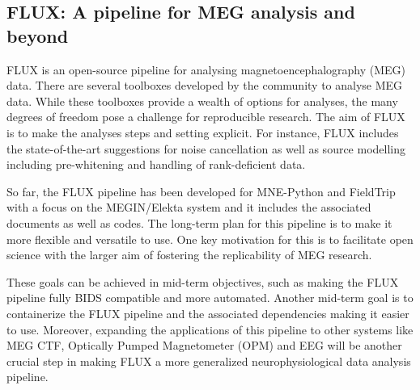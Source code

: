 \documentclass[../main.tex]{subfiles}
\begin{document}
\subsection{FLUX: A pipeline for MEG analysis and beyond}\label{sec:FLUX}


FLUX\supercite{Ferrante2022} is an open-source pipeline for analysing magnetoencephalography (MEG) data. There are several toolboxes developed by the community to analyse MEG data. While these toolboxes provide a wealth of options for analyses, the many degrees of freedom pose a challenge for reproducible research. The aim of FLUX is to make the analyses steps and setting explicit. For instance, FLUX includes the state-of-the-art suggestions for noise cancellation as well as source modelling including pre-whitening and handling of rank-deficient data.

So far, the FLUX pipeline has been developed for MNE-Python\supercite{Gramfort2014} and FieldTrip\supercite{Oostenveld2011} with a focus on the MEGIN/Elekta system and it includes the associated documents as well as codes.
The long-term plan for this pipeline is to make it more flexible and versatile to use. One key motivation for this is to facilitate open science with the larger aim of fostering the replicability of MEG research.

These goals can be achieved in mid-term objectives, such as making the FLUX pipeline fully BIDS compatible and more automated. Another mid-term goal is to containerize the FLUX pipeline and the associated dependencies making it easier to use. Moreover, expanding the applications of this pipeline to other systems like MEG CTF, Optically Pumped Magnetometer (OPM) and EEG will be another crucial step in making FLUX a more generalized neurophysiological data analysis pipeline.

\end{document}
